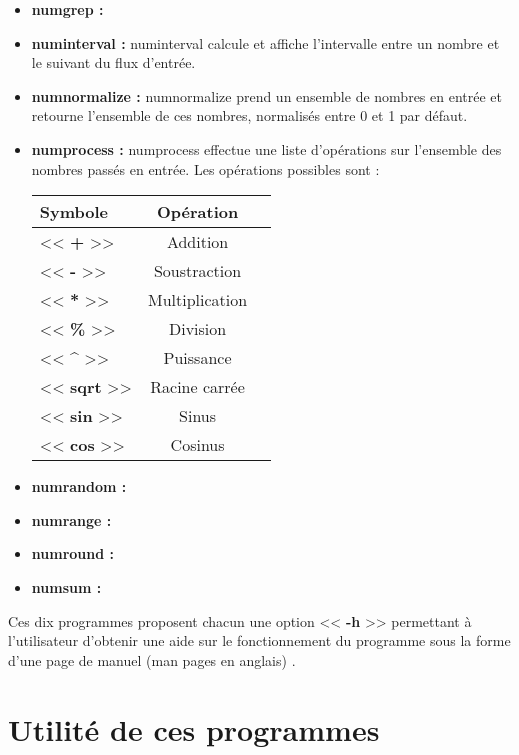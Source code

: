 \begin{itemize}
 \item[\textbullet] \textbf{numgrep :} 
 \newline
 \item[\textbullet] \textbf{numinterval :} numinterval calcule et affiche l'intervalle entre un nombre et le suivant du flux d'entr\'ee. 
 \newline
 \item[\textbullet] \textbf{numnormalize :} numnormalize prend un ensemble de nombres en entr\'ee et retourne l'ensemble de ces nombres, 
normalis\'es entre 0 et 1 par d\'efaut.
 \newline
 \item[\textbullet] \textbf{numprocess :} numprocess effectue une liste d'op\'erations sur l'ensemble des nombres pass\'es en entr\'ee.
Les op\'erations possibles sont :
\newline
\newline
\begin{tabular}{|l|c|r|}
  \hline
  Symbole &  Op\'eration\\
  \hline
  << \textbf{+} >> & Addition \\
  << \textbf{-} >> & Soustraction \\
  << \textbf{*} >> & Multiplication \\
  << \textbf{\%} >> & Division \\
  << \textbf{\^} >> & Puissance \\
  << \textbf{sqrt} >> & Racine carr\'ee \\
  << \textbf{sin} >> & Sinus \\
  << \textbf{cos} >> & Cosinus \\
  \hline
\end{tabular}
\newline
\newline
 \item[\textbullet] \textbf{numrandom :}
 \newline
 \item[\textbullet] \textbf{numrange :}
 \newline
 \item[\textbullet] \textbf{numround :}
 \newline
 \item[\textbullet] \textbf{numsum :}
 \newline
\end{itemize}

Ces dix programmes proposent chacun une option << \textbf{-h} >> permettant \`a l'utilisateur d'obtenir une aide sur le fonctionnement du 
programme sous la forme d'une page de manuel (man pages en anglais) .

\section{Utilit\'e de ces programmes}

